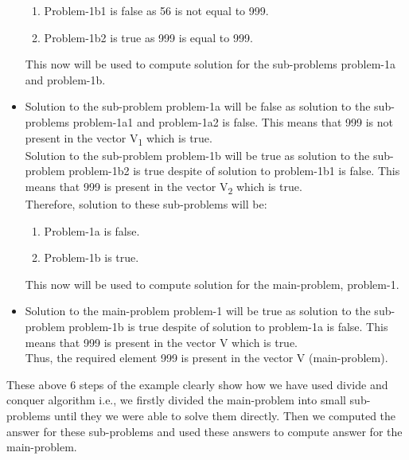 \documentclass[conference]{IEEEtran}
\begin{document}
\begin{itemize}
\begin{enumerate}
    \item Problem-1b1 is false as 56 is not equal to 999.
    \item Problem-1b2 is true as 999 is equal to 999.
\end{enumerate}
This now will be used to compute solution for the sub-problems problem-1a and problem-1b.
\item Solution to the sub-problem problem-1a will be false as solution to the sub-problems problem-1a1 and problem-1a2 is false. This means that 999 is not present in the vector V\textsubscript{1} which is true.\\
Solution to the sub-problem problem-1b will be true as solution to the sub-problem problem-1b2 is true despite of solution to problem-1b1 is false. This means that 999 is present in the vector V\textsubscript{2} which is true.\\
Therefore, solution to these sub-problems will be:
\begin{enumerate}
    \setlength{\itemindent}{1em}
    \item Problem-1a is false.
    \item Problem-1b is true.
\end{enumerate}
This now will be used to compute solution for the main-problem, problem-1.
\item Solution to the main-problem problem-1 will be true as solution to the sub-problem problem-1b is true despite of solution to problem-1a is false. This means that 999 is present in the vector V which is true.\\Thus, the required element 999 is present in the vector V (main-problem).
\end{itemize}

These above 6 steps of the example clearly show how we have used divide and conquer algorithm i.e., we firstly divided the main-problem into small sub-problems until they we were able to solve them directly. Then we computed the answer for these sub-problems and used these answers to compute answer for the main-problem.
\\
\end{document}
